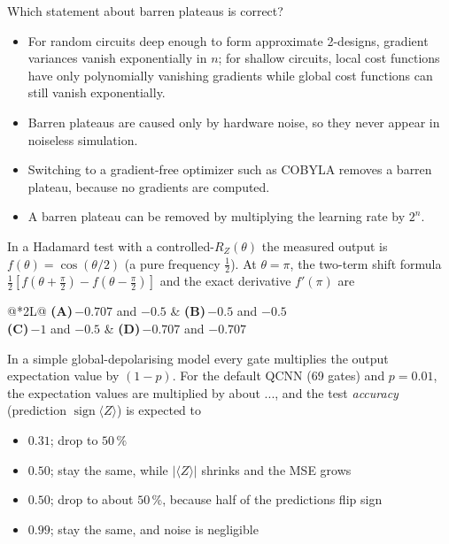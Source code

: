 \documentclass[11pt,a4paper]{article}
\newcommand{\optlabel}[1]{\textbf{(#1)}}
\newenvironment{qitem}[1]{\begin{list}{}{\setlength{\leftmargin}{3.3em}\setlength{\labelwidth}{3.1em}%
  \setlength{\labelsep}{0.2em}\setlength{\topsep}{3pt}\setlength{\parsep}{3pt}}\item[\textbf{Q.#1}\hfill]}{\end{list}}
\newcommand{\qsep}{\par\vspace{2pt}{\color{black!15}\hrule}\vspace{4pt}}
\begin{document}
\begin{qitem}{62}
Which statement about barren plateaus is correct?
\begin{itemize}[leftmargin=2.6em, labelsep=0.4em, itemsep=2pt, topsep=3pt]
\item[\optlabel{A}] For random circuits deep enough to form approximate 2-designs, gradient variances vanish exponentially in $n$; for shallow circuits, local cost functions have only polynomially vanishing gradients while global cost functions can still vanish exponentially.
\item[\optlabel{B}] Barren plateaus are caused only by hardware noise, so they never appear in noiseless simulation.
\item[\optlabel{C}] Switching to a gradient-free optimizer such as COBYLA removes a barren plateau, because no gradients are computed.
\item[\optlabel{D}] A barren plateau can be removed by multiplying the learning rate by $2^n$.
\end{itemize}
\end{qitem}
\qsep

\begin{qitem}{63}
In a Hadamard test with a controlled-$R_Z(\theta)$ the measured output is $f(\theta) = \cos(\theta/2)$ (a pure frequency
$\frac12$). At $\theta = \pi$, the two-term shift formula $\frac12[f(\theta + \frac\pi2) - f(\theta - \frac\pi2)]$ and the exact derivative $f'(\pi)$ are
\par\smallskip\noindent\begin{tabularx}{\linewidth}{@{}*{2}{L}@{}}
\optlabel{A}\,$-0.707$ and $-0.5$ & \optlabel{B}\,$-0.5$ and $-0.5$ \\[3pt]
\optlabel{C}\,$-1$ and $-0.5$ & \optlabel{D}\,$-0.707$ and $-0.707$
\end{tabularx}
\end{qitem}
\qsep

\begin{qitem}{64}
In a simple global-depolarising model every gate multiplies the output expectation value by $(1 - p)$. For the default
QCNN (69 gates) and $p = 0.01$, the expectation values are multiplied by about ..., and the test \emph{accuracy} (prediction
$\operatorname{sign}\langle Z\rangle$) is expected to
\begin{itemize}[leftmargin=2.6em, labelsep=0.4em, itemsep=2pt, topsep=3pt]
\item[\optlabel{A}] $0.31$; drop to $50\,\%$
\item[\optlabel{B}] $0.50$; stay the same, while $|\langle Z\rangle|$ shrinks and the MSE grows
\item[\optlabel{C}] $0.50$; drop to about $50\,\%$, because half of the predictions flip sign
\item[\optlabel{D}] $0.99$; stay the same, and noise is negligible
\end{itemize}
\end{qitem}
\qsep
\end{document}
